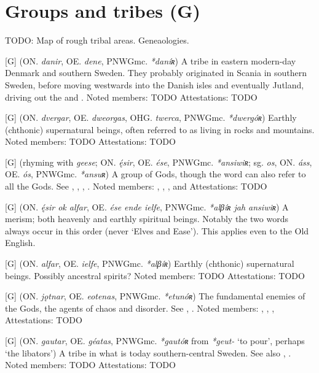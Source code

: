 \section{Groups and tribes (G)}

TODO: Map of rough tribal areas. Geneaologies.

\begin{itemize}

[G] (ON. \emph{danir}, OE. \emph{dene}, PNWGmc. \emph{*daníʀ})
  A tribe in eastern modern-day Denmark and southern Sweden. They probably originated in Scania in southern Sweden, before moving westwards into the Danish isles and eventually Jutland, driving out the  and .
  Noted members: TODO
  Attestations: TODO

[G] (ON. \emph{dvergar}, OE. \emph{dweorgas}, OHG. \emph{twerca}, PNWGmc. \emph{*dwergóʀ})
  Earthly (chthonic) supernatural beings, often referred to as living in rocks and mountains.
  Noted members: TODO
  Attestations: TODO

[G] (rhyming with \emph{geese}; ON. \emph{ę́sir}, OE. \emph{ése}, PNWGmc. \emph{*ansiwiʀ}; sg. \emph{os}, ON. \emph{áss}, OE. \emph{ós}, PNWGmc. \emph{*ansuʀ})
  A group of Gods, though the word can also refer to all the Gods. See , , , .
  Noted members: , , ,  and 
  Attestations: TODO

[G] (ON. \emph{ę́sir ok alfar}, OE. \emph{ése ende ielfe}, PNWGmc. \emph{*alβíʀ jah ansiwiʀ})
  A merism; both heavenly and earthly spiritual beings. Notably the two words always occur in this order (never ‘Elves and Ease’). This applies even to the Old English.

[G] (ON. \emph{alfar}, OE. \emph{ielfe}, PNWGmc. \emph{*alβíʀ})
  Earthly (chthonic) supernatural beings. Possibly ancestral spirits?
  Noted members: TODO
  Attestations: TODO

[G] (ON. \emph{jǫtnar}, OE. \emph{eotenas}, PNWGmc. \emph{*etunóʀ})
  The fundamental enemies of the Gods, the agents of chaos and disorder. See , .
  Noted members: , , , 
  Attestations: TODO

[G] (ON. \emph{gautar}, OE. \emph{géatas}, PNWGmc. \emph{*gautóʀ} from \emph{*geut-} ‘to pour’, perhaps ‘the libators’)
  A tribe in what is today southern-central Sweden. See also , .
  Noted members: TODO
  Attestations: TODO


\end{itemize}
